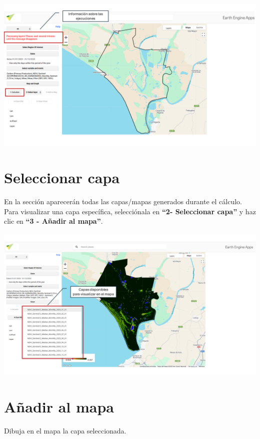 \documentclass[
]{book}
\begin{document}
\includegraphics{assets/message_es.png}

\section{\texorpdfstring{\textbf{Seleccionar capa}}{Seleccionar capa}}\label{seleccionar-capa-1}

En la sección aparecerán todas las capas/mapas generados durante el cálculo. Para visualizar una capa específica, selecciónala en \textbf{``2- Seleccionar capa''} y haz clic en \textbf{``3 - Añadir al mapa''}.

\includegraphics{assets/layers_es.png}

\section{\texorpdfstring{\textbf{Añadir al mapa}}{Añadir al mapa}}\label{auxf1adir-al-mapa-1}

Dibuja en el mapa la capa seleccionada.
\end{document}
